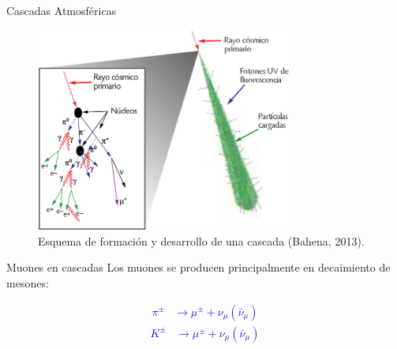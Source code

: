 \documentclass[10pt,xcolor=table]{beamer}
\begin{document}
\begin{frame}{Cascadas Atmosf\'ericas}
	\begin{figure}
	\centering
	\includegraphics[width=0.75\textwidth]{Figuras/air_shower} 
	\caption{Esquema de formación y desarrollo de una cascada (Bahena, 2013).}
	\label{fig:airshower}
	\end{figure}	
\end{frame}	

\begin{frame}{Muones en cascadas}
Los muones se producen principalmente en decaimiento de mesones: \vspace{0.5 cm}
	\begin{LARGE}
	\textcolor{blue} {
		\begin{align*}
		\pi^{\pm}	&\longrightarrow 	\mu^{\pm} + \nu_{\mu}(\bar{\nu}_{\mu})
		\end{align*}
		\begin{align*}
		K^{\pm}		&\longrightarrow 	\mu^{\pm} + \nu_{\mu}(\bar{\nu}_{\mu})
		\end{align*}
	}
	\end{LARGE}

\end{frame}
	
%
\end{document}
